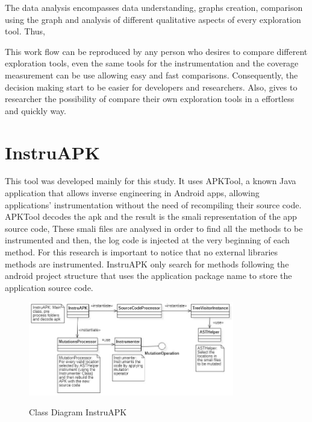
The data analysis encompasses data understanding, graphs creation, comparison using the graph and analysis of different qualitative aspects of every exploration tool. Thus, 

This work flow can be reproduced by any person who desires to compare different exploration tools, even the same tools for the instrumentation and the coverage measurement can be use allowing easy and fast comparisons. Consequently, the decision making start to be easier for developers and researchers. Also, gives to researcher the possibility of compare their own exploration tools in a effortless and quickly way.



\section{InstruAPK}\label{sec:instruAPK}

This tool was developed mainly for this study. It uses APKTool, a known Java application that allows inverse engineering in Android apps, allowing applications' instrumentation without the need of recompiling their source code. APKTool decodes the apk and the result is the smali representation of the app source code, These smali files are analysed in order to find all the methods to be instrumented and then, the log code is injected at the very beginning of each method. For this research is important to notice that no external libraries methods are instrumented. InstruAPK only search for methods following the android project structure that uses the application package name to store the application source code.

\begin{figure}[h]
\centering
\includegraphics[width=0.8\textwidth]{../Figures/ClassDiagramInstruAPK.jpg}
\label{fig:instruAPK}
\caption{Class Diagram InstruAPK}
\end{figure}


